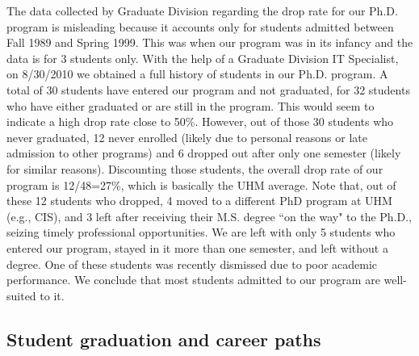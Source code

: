 \documentclass[12pt]{article}
\begin{document}
The data collected by Graduate Division regarding the drop rate for
our Ph.D. program is misleading because it
accounts only for students admitted between Fall 1989 and Spring 1999.
This was when our program was in its infancy and the data is 
for 3 students only.  With the help of a Graduate Division IT
Specialist, on 8/30/2010 we obtained a full history of students in our
Ph.D. program. A total of 30 students have entered our program and not
graduated, for 32 students who have either graduated or are still in
the program. This would seem to indicate a high drop rate close to
50\%. However, out of those 30 students who never graduated, 12 never
enrolled (likely due to personal reasons or late admission to other
programs) and 6 dropped out after only one semester (likely for
similar reasons). Discounting those students, the overall drop rate of
our program is 12/48=27\%, which is basically the UHM average.  Note
that, out of these 12 students who dropped, 4 moved to a different PhD
program at UHM (e.g., CIS), and 3 left after receiving their M.S.
degree ``on the way" to the Ph.D., seizing timely
professional opportunities.  We are left with only 5 students who
entered our program, stayed in it more than one semester, and left
without a degree. One of these students was recently dismissed due to
poor academic performance.  We conclude that most students admitted to
our program are well-suited to it.

\subsection*{Student graduation and career paths}
\end{document}
